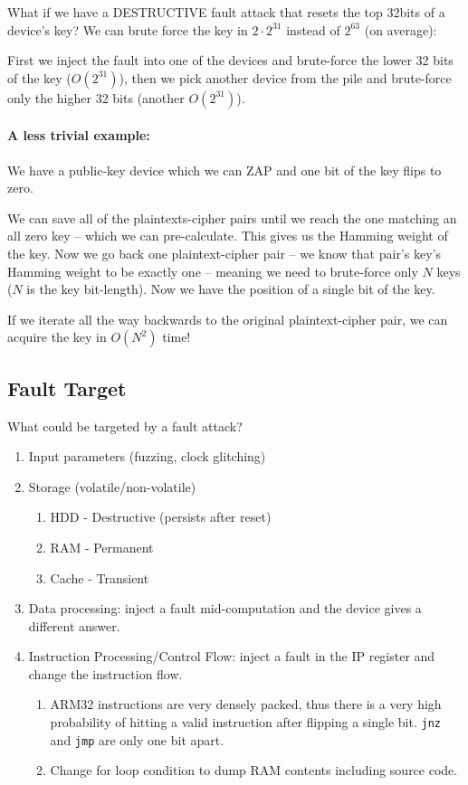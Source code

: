 What if we have a DESTRUCTIVE fault attack that resets the top 32bits of a device's key? We can brute force the key in $2\cdot2^{31}$ instead of $2^{63}$ (on average):

First we inject the fault into one of the devices and brute-force the lower 32 bits of the key ($O(2^{31})$), then we pick another device from the pile and brute-force only the higher 32 bits (another $O(2^{31})$).

\paragraph{A less trivial example:} We have a public-key device which we can ZAP and one bit of the key flips to zero.

We can save all of the plaintexts-cipher pairs until we reach the one matching an all zero key -- which we can pre-calculate. This gives us the Hamming weight of the key.
Now we go back one plaintext-cipher pair -- we know that pair's key's Hamming weight to be exactly one -- meaning we need to brute-force only $N$ keys ($N$ is the key bit-length). Now we have the position of a single bit of the key.

If we iterate all the way backwards to the original plaintext-cipher pair, we can acquire the key in $O(N^2)$ time!

\subsection{Fault Target}
What could be targeted by a fault attack?
\begin{enumerate}
	\item Input parameters (fuzzing, clock glitching)
	\item Storage (volatile/non-volatile)
	\begin{enumerate}
		\item HDD - Destructive (persists after reset)
		\item RAM - Permanent
		\item Cache - Transient
	\end{enumerate}
	\item Data processing: inject a fault mid-computation and the device gives a different answer.
	\item Instruction Processing/Control Flow: inject a fault in the IP register and change the instruction flow.
	\begin{enumerate}
		\item ARM32 instructions are very densely packed, thus there is a very high probability of hitting a valid instruction after flipping a single bit. \texttt{jnz} and \texttt{jmp} are only one bit apart.
		\item Change for loop condition to dump RAM contents including source code.
	\end{enumerate}
\end{enumerate}

